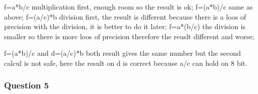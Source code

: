 \documentclass[a4paper,10pt]{article}
\begin{document}
f=a*b/c multiplication first, enough room so the result is ok; 
f=(a*b)/c same as above; 
f=(a/c)*b division first, the result is different because there is a loos of precision with the division, it is better to do it later; 
f=a*(b/c) the division is smaller so there is more loos of precision therefore the reuslt different and worse; 

f=(a*b)/c and 
d=(a/c)*b both result gives the same number but the second calcul is not safe, here the result on d is correct because a/c can hold on 8 bit.
    
\subsubsection*{Question 5}
\end{document}
